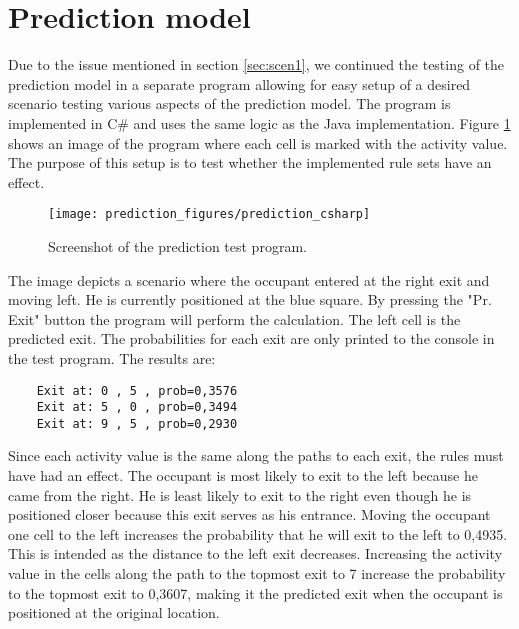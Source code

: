 \section{Prediction model}
\label{eval_prediction}
Due to the issue mentioned in section \ref{sec:scen1}, we continued the testing of the prediction model in a separate program allowing for easy setup of a desired scenario testing various aspects of the prediction model. The program is implemented in C\# and uses the same logic as the Java implementation. Figure \ref{fig:pred_c} shows an image of the program where each cell is marked with the activity value. The purpose of this setup is to test whether the implemented rule sets have an effect.
\begin{figure}[htb]
	\centering
	\texttt{[image: prediction\_figures/prediction\_csharp]}
	\caption{Screenshot of the prediction test program.}
	\label{fig:pred_c}
\end{figure}
The image depicts a scenario where the occupant entered at the right exit and moving left. He is currently positioned at the blue square. By pressing the "Pr. Exit" button the program will perform the calculation. The left cell is the predicted exit. The probabilities for each exit are only printed to the console in the test program. The results are:
\begin{verbatim}
    Exit at: 0 , 5 , prob=0,3576
    Exit at: 5 , 0 , prob=0,3494
    Exit at: 9 , 5 , prob=0,2930
\end{verbatim}
Since each activity value is the same along the paths to each exit, the rules must have had an effect. The occupant is most likely to exit to the left because he came from the right. He is least likely to exit to the right even though he is positioned closer because this exit serves as his entrance. Moving the occupant one cell to the left increases the probability that he will exit to the left to 0,4935. This is intended as the distance to the left exit decreases. Increasing the activity value in the cells along the path to the topmost exit to 7 increase the probability to the topmost exit to 0,3607, making it the predicted exit when the occupant is positioned at the original location. 
